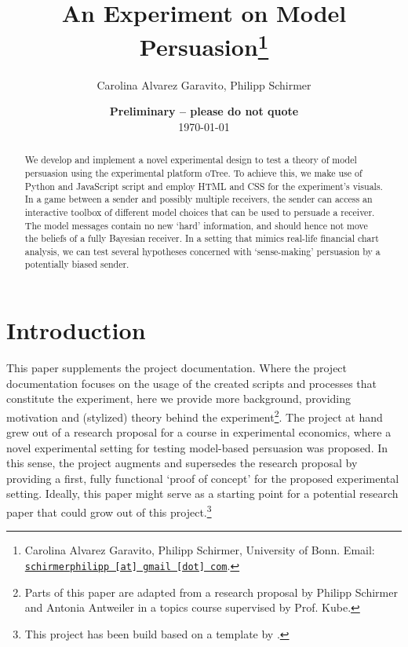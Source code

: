 \documentclass[11pt, a4paper, leqno]{article}
\begin{document}
\title{An Experiment on Model Persuasion\thanks{Carolina Alvarez Garavito, Philipp Schirmer, University of Bonn. Email: \href{mailto:schirmerphilipp@gmail.com}{\nolinkurl{schirmerphilipp [at] gmail [dot] com}}.}}

\author{Carolina Alvarez Garavito, Philipp Schirmer}

\date{
    {\bf Preliminary -- please do not quote}
    \\[1ex]
    \today
}

\maketitle


\begin{abstract}
    We develop and implement a novel experimental design to test a theory of model persuasion using the 
    experimental platform oTree. To achieve this, we make use of Python and JavaScript script and employ HTML and CSS for the experiment's visuals. In a game between a sender and possibly multiple receivers, the sender can access an interactive toolbox of different model choices that can be used to persuade a receiver. The model messages contain no
    new `hard' information, and should hence not move the beliefs of a fully Bayesian receiver. In a setting that mimics real-life financial chart analysis, we can test several hypotheses concerned with `sense-making' persuasion by a potentially biased sender.
\end{abstract}
\clearpage

\section{Introduction} %
\label{sec:introduction}

This paper supplements the project documentation. Where the project documentation focuses on the usage of the created scripts and processes that constitute the experiment, here we provide more background, providing motivation and (stylized) theory behind the experiment\footnote{Parts of this paper are adapted from a research proposal by Philipp Schirmer and Antonia Antweiler in a topics course supervised by Prof. Kube.}. The project at hand grew out of a research proposal for a course in experimental economics, where a novel experimental setting for testing model-based persuasion was proposed. In this sense, the project augments and supersedes the research proposal by providing a first, fully functional `proof of concept' for the proposed experimental setting. Ideally, this paper might serve as a starting point for a potential research paper that could grow out of this project.\footnote{This project has been build based on a template by \cite{GaudeckerEconProjectTemplates}.}
\end{document}
